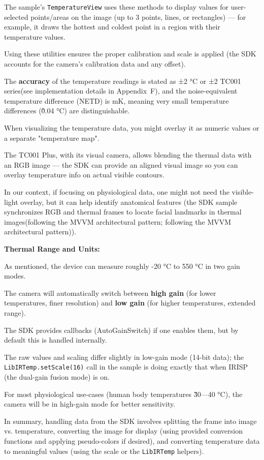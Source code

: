 {The sample's \texttt{TemperatureView} uses these methods to display values for
user-selected points/areas on the image (up to 3 points, lines, or rectangles) ---
for example, it draws the hottest and coldest point in a region with their
temperature values.

Using these utilities ensures the proper calibration and scale is applied (the SDK
accounts for the camera's calibration data and any offset).

The \textbf{accuracy}
 of the temperature readings is stated as ±2 °C or ±2%
 TC001 series(see implementation details in Appendix~F), and the noise-equivalent
 temperature difference (NETD) is  mK, meaning very small temperature differences
 (\~0.04 °C) are distinguishable.

When visualizing the temperature data, you might overlay it as numeric values or a
separate "temperature map".

The TC001 Plus, with its visual camera, allows blending the thermal data with an RGB
image --- the SDK can provide an aligned visual image so you can overlay temperature
info on actual visible contours.

In our context, if focusing on physiological data, one might not need the
visible-light overlay, but it can help identify anatomical features (the SDK sample
synchronizes RGB and thermal frames to locate facial landmarks in thermal
images(following the MVVM architectural pattern; following the MVVM architectural
pattern)).

\textbf{Thermal Range and Units:}

As mentioned, the device can measure roughly -20 °C to 550 °C in two gain modes.

The camera will automatically switch between \textbf{high gain}
 (for lower temperatures, finer resolution) and \textbf{low gain}
 (for higher temperatures, extended range).

The SDK provides callbacks (AutoGainSwitch) if one enables them, but by default this
is handled internally.

The raw values and scaling differ slightly in low-gain mode (14-bit data); the
\texttt{LibIRTemp.setScale(16)} call in the sample is doing exactly that when IRISP
(the dual-gain fusion mode) is on.

For most physiological use-cases (human body temperatures \~30---40 °C), the camera
will be in high-gain mode for better sensitivity.

In summary, handling data from the SDK involves splitting the frame into image vs.
temperature, converting the image for display (using provided conversion functions
and applying pseudo-colors if desired), and converting temperature data to meaningful
values (using the scale or the \texttt{LibIRTemp} helpers).

}
